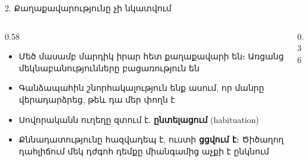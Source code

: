 \begin{frame}{2. Քաղաքավարությունը չի նկատվում}
  \begin{columns}[c]
    \begin{column}{0.58\textwidth}
      \begin{itemize}
        \item Մեծ մասամբ մարդիկ իրար հետ քաղաքավարի են։ Առցանց մեկնաբանությունները բացառություն են
        \item<2-> Գանձապահին շնորհակալություն ենք ասում, որ մանրը վերադարձրեց, թեև դա մեր փողն է
        \item<3-> Սովորականն ուղեղը զտում է. \textbf{ընտելացում} (habituation)
        \item<4-> Քննադատությունը հազվադեպ է, ուստի \textbf{ցցվում է}։ Ծիծաղող դահլիճում մեկ դժգոհ դեմքը միանգամից աչքի է ընկնում
      \end{itemize}
    \end{column}
    \begin{column}{0.36\textwidth}
      \centering
    \end{column}
  \end{columns}
\end{frame}

